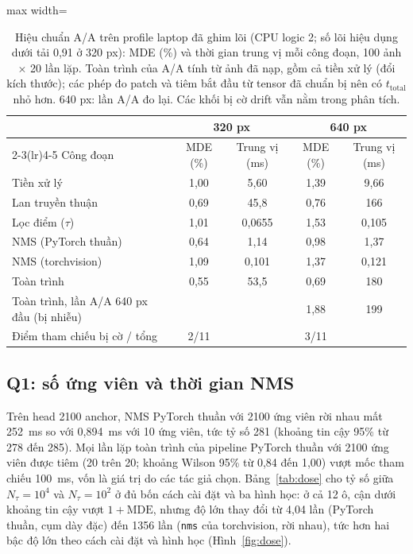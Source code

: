 \documentclass[a4paper,fleqn]{cas-dc}
\newcommand{\Ntau}{N_{\tau}}
\begin{document}
\begin{table}[!tp]
\centering\small
\caption{Hiệu chuẩn A/A trên profile laptop đã ghim lõi (CPU logic 2; số lõi hiệu dụng dưới tải 0,91 ở 320 px): MDE (\%) và thời gian trung vị mỗi công đoạn, 100 ảnh $\times$ 20 lần lặp. Toàn trình của A/A tính từ ảnh đã nạp, gồm cả tiền xử lý (đổi kích thước); các phép đo patch và tiêm bắt đầu từ tensor đã chuẩn bị nên có $t_{\mathrm{total}}$ nhỏ hơn. 640 px: lần A/A đo lại. Các khối bị cờ drift vẫn nằm trong phân tích.}
\label{tab:aa}
\begin{adjustbox}{max width=\textwidth}
\begin{tabular}{@{}lcccc@{}}
\toprule
 & \multicolumn{2}{c}{320 px} & \multicolumn{2}{c}{640 px} \\
\cmidrule(lr){2-3}\cmidrule(lr){4-5}
Công đoạn & MDE (\%) & Trung vị (ms) & MDE (\%) & Trung vị (ms) \\
\midrule
Tiền xử lý & 1,00 & 5,60 & 1,39 & 9,66 \\
Lan truyền thuận & 0,69 & 45,8 & 0,76 & 166 \\
Lọc điểm ($\tau$) & 1,01 & 0,0655 & 1,53 & 0,105 \\
NMS (PyTorch thuần) & 0,64 & 1,14 & 0,98 & 1,37 \\
NMS (torchvision) & 1,09 & 0,101 & 1,37 & 0,121 \\
Toàn trình & 0,55 & 53,5 & 0,69 & 180 \\
Toàn trình, lần A/A 640 px đầu (bị nhiễu) & & & 1,88 & 199 \\
Điểm tham chiếu bị cờ / tổng & 2/11 & & 3/11 & \\
\bottomrule
\end{tabular}
\end{adjustbox}
\end{table}

\subsection{Q1: số ứng viên và thời gian NMS}
\label{sec:q1}
Trên head 2100 anchor, NMS PyTorch thuần với 2100 ứng viên rời nhau mất 252~ms so với 0,894~ms với 10 ứng viên, tức tỷ số 281 (khoảng tin cậy 95\% từ 278 đến 285). Mọi lần lặp toàn trình của pipeline PyTorch thuần với 2100 ứng viên được tiêm (20 trên 20; khoảng Wilson 95\% từ 0,84 đến 1,00) vượt mốc tham chiếu 100~ms, vốn là giá trị do các tác giả chọn. Bảng~\ref{tab:dose} cho tỷ số giữa $\Ntau=10^4$ và $\Ntau=10^2$ ở đủ bốn cách cài đặt và ba hình học: ở cả 12 ô, cận dưới khoảng tin cậy vượt $1+\mathrm{MDE}$, nhưng độ lớn thay đổi từ 4,04 lần (PyTorch thuần, cụm dày đặc) đến 1356 lần (\texttt{nms} của torchvision, rời nhau), tức hơn hai bậc độ lớn theo cách cài đặt và hình học (Hình~\ref{fig:dose}).
\end{document}
